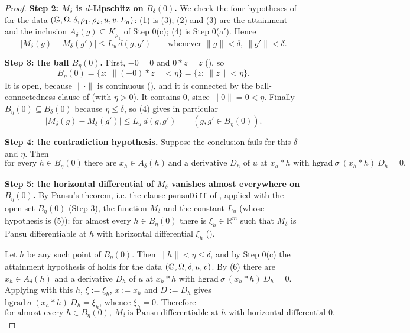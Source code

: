 \begin{proof}
\medskip\noindent\textbf{Step 2: $M_\delta$ is $d$-Lipschitz on $B_\delta(0)$.} We check the
four hypotheses of  for the data $(\mathbb G,\Omega,\delta,\rho_1,\rho_2,u,v,L_u)$:
(1) is (3); (2) and (3) are the attainment and the inclusion $A_\delta(g)\subseteq K_{\rho_1}$
of Step 0(c); (4) is Step 0(a$'$). Hence
\[
 \big|M_\delta(g)-M_\delta(g')\big|\le L_u\,d(g,g')\qquad\text{whenever }\|g\|<\delta,\ \|g'\|<\delta .
 \tag{4}
\]

\medskip\noindent\textbf{Step 3: the ball $B_\eta(0)$.} First, $-0=0$ and $0*z=z$
(), so
\[
 B_\eta(0)=\{z:\ \|(-0)*z\|<\eta\}=\{z:\ \|z\|<\eta\} .
\]
It is open, because $\|\cdot\|$ is continuous (), and it is connected
by the ball-connectedness clause of  (with $\eta>0$). It contains
$0$, since $\|0\|=0<\eta$. Finally $B_\eta(0)\subseteq B_\delta(0)$ because $\eta\le\delta$,
so (4) gives in particular
\[
 \big|M_\delta(g)-M_\delta(g')\big|\le L_u\,d(g,g')\qquad(g,g'\in B_\eta(0)). \tag{5}
\]

\medskip\noindent\textbf{Step 4: the contradiction hypothesis.} Suppose the conclusion fails
for this $\delta$ and $\eta$. Then
\[
 \text{for every }h\in B_\eta(0)\ \text{there are } x_h\in A_\delta(h)\ \text{and a
 derivative } D_h \text{ of } u \text{ at } x_h*h \text{ with }
 \mathrm{hgrad}\ \sigma\ (x_h*h)\ D_h=0 . \tag{6}
\]

\medskip\noindent\textbf{Step 5: the horizontal differential of $M_\delta$ vanishes almost
everywhere on $B_\eta(0)$.} By Pansu's theorem, i.e. the clause $\mathtt{pansuDiff}$ of
, applied with the open set $B_\eta(0)$ (Step 3), the function
$M_\delta$ and the constant $L_u$ (whose hypothesis is (5)): for almost every
$h\in B_\eta(0)$ there is $\xi_h\in\mathbb R^{m}$ such that $M_\delta$ is Pansu
differentiable at $h$ with horizontal differential $\xi_h$ ().

Let $h$ be any such point of $B_\eta(0)$. Then $\|h\|<\eta\le\delta$, and by Step 0(c) the
attainment hypothesis of  holds for the data
$(\mathbb G,\Omega,\delta,u,v)$. By (6) there are $x_h\in A_\delta(h)$ and a derivative $D_h$ of
$u$ at $x_h*h$ with $\mathrm{hgrad}\ \sigma\ (x_h*h)\ D_h=0$. Applying
 with this $h$, $\xi:=\xi_h$, $x:=x_h$ and $D:=D_h$ gives
$\mathrm{hgrad}\ \sigma\ (x_h*h)\ D_h=\xi_h$, whence $\xi_h=0$. Therefore
\[
 \text{for almost every } h\in B_\eta(0),\ M_\delta\ \text{is Pansu differentiable at }h
 \text{ with horizontal differential } 0 . \tag{7}
\]


\end{proof}
